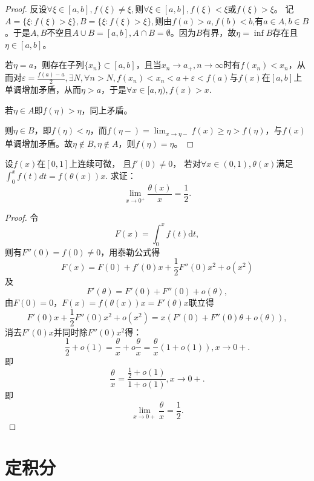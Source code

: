 \begin{proof}
  反设$\forall\xi\in[a,b],f(\xi)\neq\xi,$则$\forall\xi\in[a,b],f(\xi)<\xi$或$f(\xi)>\xi$。
  记$A=\{\xi:f(\xi)>\xi\},B=\{\xi:f(\xi)>\xi\},$则由$f(a)>a,f(b)<b$,有$a\in A,b\in B$。于是$A,B$不空且$A\cup B=[a,b],A\cap B=\emptyset$。因为$B$有界，故$\eta=\inf B$存在且$\eta\in[a,b]$。
  
  若$\eta=a$，则存在子列$\{x_n\}\subset[a,b]$，且当$x_n\rightarrow a_+,n\rightarrow\infty$时有$f(x_n)<x_n$，从而对$\varepsilon=\frac{f(a)-a}{2},\exists N,\forall n>N,f(x_n)<x_n<a+\varepsilon<f(a)$与$f(x)$在$[a,b]$上单调增加矛盾，从而$\eta>a$，于是$\forall x\in[a,\eta),f(x)>x.$
  
  若$\eta\in A$即$f(\eta)>\eta$，同上矛盾。
  
  则$\eta\in B$，即$f(\eta)<\eta$，而$f(\eta-)=\lim_{x\rightarrow\eta-}f(x)\geq\eta>f(\eta)$，与$f(x)$单调增加矛盾。故$\eta\not\in B,\eta\not\in A$，则$f(\eta)=\eta$。
  \end{proof}
  
  \begin{example}
   设$f(x)$在$[0,1]$上连续可微，
   且$f'(0)\neq0$，
   若对$\forall x\in(0,1),\theta(x)$满足$\int_0^xf(t)dt=f(\theta(x))x$. 
   求证：
   \begin{equation*}
    \lim_{x\rightarrow 0^+}\frac{\theta(x)}x=\frac12.
   \end{equation*}
  \end{example}
  
  \begin{proof}
     令$$F(x)=\int_0^xf(t)\mathrm{d}t,$$
  则有$F''(0)=f(0)\neq0$，用泰勒公式得
  $$F(x)=F(0)+f'(0)x+\frac{1}{2}F''(0)x^2+o(x^2)$$
  及
  $$F'(\theta)=F'(0)+F''(0)+o(\theta),$$
  由$F(0)=0$，$F(x)=f(\theta(x))x=F'(\theta)x$联立得
  $$F'(0)x+\frac{1}{2}F''(0)x^2+o(x^2)=x(F'(0)+F''(0)\theta+o(\theta)),$$
  消去$F'(0)x$并同时除$F''(0)x^2$得：
  \begin{equation*}
    \frac{1}{2}+o(1)=\frac{\theta}{x}+o\frac{\theta}{x}=\frac{\theta}{x}(1+o(1)),x\rightarrow0+.
  \end{equation*}
  即
  \begin{equation*}
    \frac{\theta}{x}=\frac{\frac{1}{2}+o(1)}{1+o(1)},x\rightarrow0+.
  \end{equation*}
  即
  \begin{equation*}
    \lim_{x\rightarrow0+}\frac{\theta}{x}=\frac{1}{2}.
  \end{equation*}
  \end{proof}
 
  
\section{定积分}

